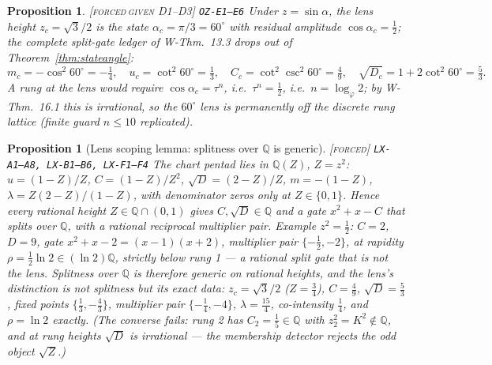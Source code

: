 \documentclass[11pt]{article}
\newcommand{\tagF}{\textcolor{cF}{\textsc{[forced]}}}
\newcommand{\tagFD}{\textcolor{cF}{\textsc{[forced}}\,\textcolor{cD}{\textsc{given D1--D3]}}}
\newcommand{\hx}[1]{\textcolor{cC}{\footnotesize\texttt{#1}}}
\newcommand{\Q}{\mathbb{Q}}
\newcommand{\gp}{\varphi}
\theoremstyle{plain}
\newtheorem{proposition}[theorem]{Proposition}
\theoremstyle{definition}
\theoremstyle{remark}
\begin{document}
\begin{proposition}\label{prop:lens}\tagFD{} \hx{OZ-E1--E6}
Under $z=\sin\alpha$, the lens height $z_c=\sqrt3/2$ is the state
$\alpha_c=\pi/3=60^\circ$ with residual amplitude $\cos\alpha_c=\tfrac12$; the
complete split-gate ledger of W-Thm.\ 13.3 drops out of
Theorem~\ref{thm:stateangle}:
\[
m_c=-\cos^2 60^\circ=-\tfrac14,\quad
u_c=\cot^2 60^\circ=\tfrac13,\quad
C_c=\cot^2\!\csc^2 60^\circ=\tfrac49,\quad
\sqrt{D_c}=1+2\cot^2 60^\circ=\tfrac53 .
\]
A rung at the lens would require $\cos\alpha_c=\tau^n$, i.e.\ $\tau^n=\tfrac12$,
i.e.\ $n=\log_\gp2$; by W-Thm.\ 16.1 this is irrational, so the $60^\circ$ lens is
permanently off the discrete rung lattice (finite guard $n\le10$ replicated).
\end{proposition}

\begin{proposition}[Lens scoping lemma: splitness over $\Q$ is generic]\label{prop:lensscope}\tagF{} \hx{LX-A1--A8, LX-B1--B6, LX-F1--F4}
The chart pentad lies in $\Q(Z)$, $Z=z^2$: $u=(1-Z)/Z$, $C=(1-Z)/Z^2$,
$\sqrt D=(2-Z)/Z$, $m=-(1-Z)$, $\lambda=Z(2-Z)/(1-Z)$, with denominator
zeros only at $Z\in\{0,1\}$. Hence \emph{every} rational height
$Z\in\Q\cap(0,1)$ gives $C,\sqrt D\in\Q$ and a gate $x^2+x-C$ that splits
over $\Q$, with a rational reciprocal multiplier pair. Example
$z^2=\tfrac12$: $C=2$, $D=9$, gate $x^2+x-2=(x-1)(x+2)$, multiplier pair
$\{-\tfrac12,-2\}$, at rapidity $\rho=\tfrac12\ln2\in(\ln2)\Q$, strictly
below rung 1 --- a rational split gate that is not the lens. Splitness over
$\Q$ is therefore \emph{generic} on rational heights, and the lens's
distinction is not splitness but its exact data: $z_c=\sqrt3/2$
($Z=\tfrac34$), $C=\tfrac49$, $\sqrt D=\tfrac53$, fixed points
$\{\tfrac13,-\tfrac43\}$, multiplier pair $\{-\tfrac14,-4\}$,
$\lambda=\tfrac{15}4$, co-intensity $\tfrac14$, and $\rho=\ln2$ exactly.
(The converse fails: rung 2 has $C_2=\tfrac15\in\Q$ with
$z_2^2=K^2\notin\Q$, and at rung heights $\sqrt D$ is irrational --- the
membership detector rejects the odd object $\sqrt Z$.)
\end{proposition}
\end{document}
